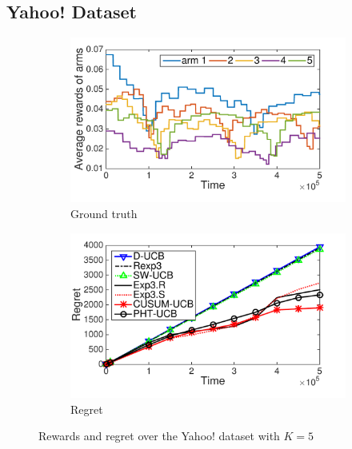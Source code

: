 \documentclass[letterpaper]{article} %
\begin{document}
\subsection{Yahoo! Dataset}
\begin{figure}[t]
\centering
\begin{subfigure}[b]{0.45\textwidth}
    \includegraphics[width=\textwidth]{Yahoo_groundtruth}
     \caption{Ground truth}\label{subfig:truth}
\end{subfigure}
\begin{subfigure}[b]{0.45\textwidth}
    \includegraphics[width=\textwidth]{Yahoo_result_NIPS}
     \caption{Regret}\label{subfig:result}
\end{subfigure}
\caption{Rewards and regret over the Yahoo! dataset with $K=5$}
\label{fig:yahoo}
\end{figure}
\end{document}
